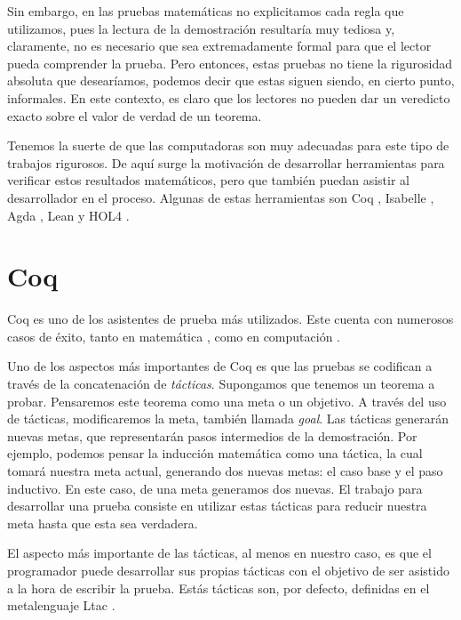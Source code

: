 Sin embargo, en las pruebas matemáticas no explicitamos cada regla que utilizamos, pues la lectura de la demostración resultaría muy tediosa y, claramente, no es necesario que sea extremadamente formal para que el lector pueda comprender la prueba.
Pero entonces, estas pruebas no tiene la rigurosidad absoluta que desearíamos, podemos decir que estas siguen siendo, en cierto punto, informales.
En este contexto, es claro que los lectores no pueden dar un veredicto exacto sobre el valor de verdad de un teorema.

Tenemos la suerte de que las computadoras son muy adecuadas para este tipo de trabajos rigurosos. De aquí surge la motivación de desarrollar herramientas para verificar estos resultados matemáticos, pero que también puedan asistir al desarrollador en el proceso. Algunas de estas herramientas son Coq \cite{CIC}, Isabelle \cite{DBLP:books/sp/NipkowPW02}, Agda \cite{DBLP:conf/tphol/BoveDN09}, Lean \cite{DBLP:conf/cade/MouraKADR15} y HOL4 \cite{DBLP:conf/tphol/SlindN08}.

\section{Coq}

Coq es uno de los asistentes de prueba más utilizados.
Este cuenta con numerosos casos de éxito, tanto en matemática \cite{DBLP:conf/ascm/Gonthier07}, como en computación \cite{DBLP:journals/pacmpl/0002JKD18}.

Uno de los aspectos más importantes de Coq es que las pruebas se codifican a través de la concatenación de \emph{tácticas}.
Supongamos que tenemos un teorema a probar.
Pensaremos este teorema como una meta o un objetivo.
A través del uso de tácticas, modificaremos la meta, también llamada \emph{goal}.
Las tácticas generarán nuevas metas, que representarán pasos intermedios de la demostración.
Por ejemplo, podemos pensar la inducción matemática como una táctica, la cual tomará nuestra meta actual, generando dos nuevas metas: el caso base y el paso inductivo. En este caso, de una meta generamos dos nuevas.
El trabajo para desarrollar una prueba consiste en utilizar estas tácticas para reducir nuestra meta hasta que esta sea verdadera.

El aspecto más importante de las tácticas, al menos en nuestro caso, es que el programador puede desarrollar sus propias tácticas con el objetivo de ser asistido a la hora de escribir la prueba.
Estás tácticas son, por defecto, definidas en el metalenguaje Ltac \cite{DBLP:conf/lpar/Delahaye00}.

